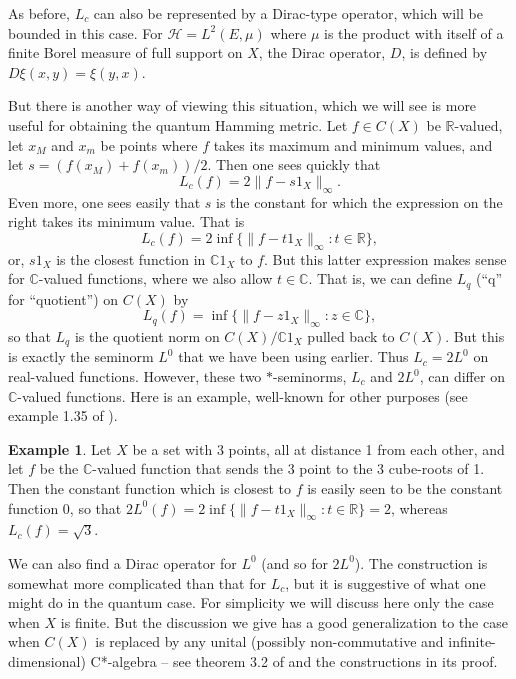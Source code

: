 \documentclass{amsart}[14pt]
\theoremstyle{definition}
\newtheorem{example}[theorem]{Example}
\theoremstyle{remark}
\newcommand{\cH}{{\mathcal H}}
\newcommand{\bC}{{\mathbb C}}
\newcommand{\bR}{{\mathbb R}}
\newcommand{\<}{\langle}
\renewcommand{\>}{\rangle}
\numberwithin{equation}{section}
\begin{document}
{As before, $L_c$ can also
be represented by a Dirac-type operator, which
will be bounded in this case. For $\cH = L^2(E, \mu)$
where $\mu$ is the product with itself of
a finite Borel measure of full support on $X$, the 
Dirac operator, $D$, is defined by
 $D\xi(x, y) = \xi(y,x)$.
 
But there is another way of viewing this situation, which we will see
is more useful for obtaining the quantum Hamming metric.
Let $f \in C(X)$ be $\bR$-valued, let $x_M$ and $x_m$ be points
where $f$ takes its maximum and minimum values,
and let $s = (f(x_M) +f(x_m))/2$. Then one sees quickly that
\[
L_c(f) = 2\|f - s1_X\|_\infty  .
\] 
Even more, one sees easily that $s$ is the constant for which
the expression on the right takes its minimum value. That
is 
\begin{equation}
\label{nearest}
L_c(f) = 2\inf \{\|f - t1_X\|_\infty: t \in \bR\},
\end{equation}
or, $s1_X$ is the closest function in $\bC 1_X $ to $f$.
But this latter expression makes sense for $\bC$-valued
functions, where we also allow $ t \in \bC$. That is,
we can define $L_q$ (``q'' for ``quotient'') on $C(X)$ by
\[
L_q(f) = \inf \{\|f - z1_X\|_\infty: z \in \bC\}  ,
\]
so that $L_q$ is the quotient norm on $C(X)/\bC1_X$
pulled back to $C(X)$. But this is exactly the seminorm $L^0$
that we have been using earlier. Thus
$L_c = 2L^0$ on real-valued functions. However,
these two $*$-seminorms, $L_c$ and  $2L^0$, 
can differ on $\bC$-valued 
functions. Here is an example, well-known for other
purposes (see example 1.35 of \cite{Wvr4}). 

\begin{example}
Let $X$ be a set with 3 points, all at
distance 1 from each other, and let $f$ be the $\bC$-valued
function that sends the 3 point to the 3 cube-roots of
1. Then the constant function which is closest to $f$ is easily
seen to be the constant function 0,  so that 
$2L^0(f) = 2\inf \{\|f - t1_X \|_\infty: t \in \bR\} = 2$, whereas $L_c(f) = \sqrt 3$.
\end{example} 

We can also find a Dirac operator for $L^0$ (and so for $2L^0$).
The construction is somewhat more complicated
than that for $L_c$,
but it is suggestive of what one might do in the
quantum case.
For simplicity we will discuss here only the case when
$X$ is finite. But the discussion we give has a good
generalization to the case when $C(X)$ is replaced
by any unital (possibly non-commutative and 
infinite-dimensional) C*-algebra -- see theorem 3.2
of \cite{R24} and the constructions in its proof.

}
\end{document}
